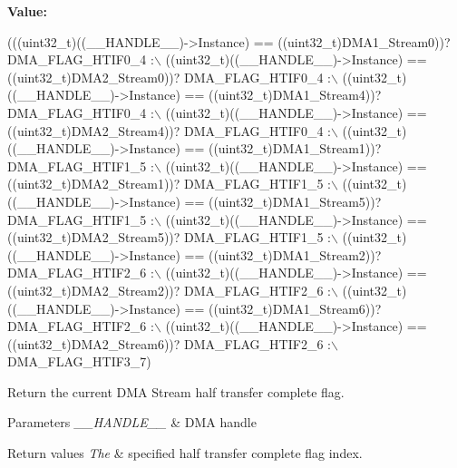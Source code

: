 {\bfseries Value\+:}
\begin{DoxyCode}
(((uint32\_t)((\_\_HANDLE\_\_)->Instance) == ((uint32\_t)DMA1\_Stream0))? DMA\_FLAG\_HTIF0\_4 :\(\backslash\)
 ((uint32\_t)((\_\_HANDLE\_\_)->Instance) == ((uint32\_t)DMA2\_Stream0))? DMA\_FLAG\_HTIF0\_4 :\(\backslash\)
 ((uint32\_t)((\_\_HANDLE\_\_)->Instance) == ((uint32\_t)DMA1\_Stream4))? DMA\_FLAG\_HTIF0\_4 :\(\backslash\)
 ((uint32\_t)((\_\_HANDLE\_\_)->Instance) == ((uint32\_t)DMA2\_Stream4))? DMA\_FLAG\_HTIF0\_4 :\(\backslash\)
 ((uint32\_t)((\_\_HANDLE\_\_)->Instance) == ((uint32\_t)DMA1\_Stream1))? DMA\_FLAG\_HTIF1\_5 :\(\backslash\)
 ((uint32\_t)((\_\_HANDLE\_\_)->Instance) == ((uint32\_t)DMA2\_Stream1))? DMA\_FLAG\_HTIF1\_5 :\(\backslash\)
 ((uint32\_t)((\_\_HANDLE\_\_)->Instance) == ((uint32\_t)DMA1\_Stream5))? DMA\_FLAG\_HTIF1\_5 :\(\backslash\)
 ((uint32\_t)((\_\_HANDLE\_\_)->Instance) == ((uint32\_t)DMA2\_Stream5))? DMA\_FLAG\_HTIF1\_5 :\(\backslash\)
 ((uint32\_t)((\_\_HANDLE\_\_)->Instance) == ((uint32\_t)DMA1\_Stream2))? DMA\_FLAG\_HTIF2\_6 :\(\backslash\)
 ((uint32\_t)((\_\_HANDLE\_\_)->Instance) == ((uint32\_t)DMA2\_Stream2))? DMA\_FLAG\_HTIF2\_6 :\(\backslash\)
 ((uint32\_t)((\_\_HANDLE\_\_)->Instance) == ((uint32\_t)DMA1\_Stream6))? DMA\_FLAG\_HTIF2\_6 :\(\backslash\)
 ((uint32\_t)((\_\_HANDLE\_\_)->Instance) == ((uint32\_t)DMA2\_Stream6))? DMA\_FLAG\_HTIF2\_6 :\(\backslash\)
   DMA\_FLAG\_HTIF3\_7)
\end{DoxyCode}


Return the current D\+MA Stream half transfer complete flag. 


\begin{DoxyParams}{Parameters}
{\em \+\_\+\+\_\+\+H\+A\+N\+D\+L\+E\+\_\+\+\_\+} & D\+MA handle \\
\hline
\end{DoxyParams}

\begin{DoxyRetVals}{Return values}
{\em The} & specified half transfer complete flag index. \\
\hline
\end{DoxyRetVals}
\mbox{\label{group___d_m_a_ga206f24e6bee4600515b9b6b1ec79365b}} 
